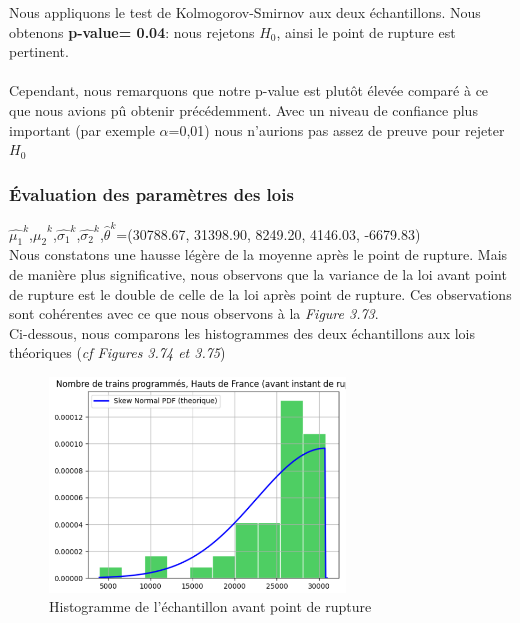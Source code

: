 {Nous appliquons le test de Kolmogorov-Smirnov aux deux échantillons. Nous obtenons \textbf{p-value= 0.04}: nous rejetons $H_0$, ainsi le point de rupture est pertinent.\\

\\Cependant, nous remarquons que notre p-value est plutôt élevée comparé à ce que nous avions pû obtenir précédemment. Avec un niveau de confiance plus important (par exemple $\alpha$=0,01) nous n'aurions pas assez de preuve pour rejeter $H_0$

\subsubsection{Évaluation des paramètres des lois}

$\hat{\mu_1}^k$,$\hat{\mu_2}^k$,$\hat{\sigma_1}^k$,$\hat{\sigma_2}^k$,$\hat{\theta}^k$=(30788.67, 31398.90, 8249.20, 4146.03, -6679.83)\\

Nous constatons une hausse légère de la moyenne après le point de rupture. Mais de manière plus significative, nous observons que la variance de la loi avant point de rupture est le double de celle de la loi après point de rupture. Ces observations sont cohérentes avec ce que nous observons à la \textit{Figure 3.73}.\\

Ci-dessous, nous comparons les histogrammes des deux échantillons aux lois théoriques (\textit{cf Figures 3.74 et 3.75})

\begin{figure}[H]
  \centering
  \includegraphics[width=0.7\textwidth]{HF_TP_4.png}
  \caption{Histogramme de l'échantillon avant point de rupture}
\end{figure}

}
